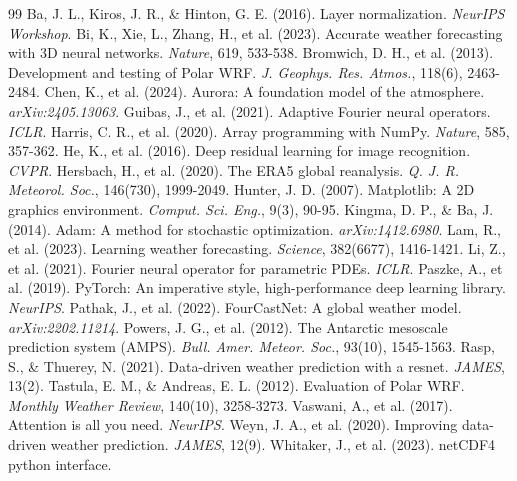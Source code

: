 \documentclass[12pt,titlepage,a4paper]{report}
\begin{document}
\begin{thebibliography}{99}
 Ba, J. L., Kiros, J. R., \& Hinton, G. E. (2016). Layer normalization. \textit{NeurIPS Workshop}.
 Bi, K., Xie, L., Zhang, H., et al. (2023). Accurate weather forecasting with 3D neural networks. \textit{Nature}, 619, 533-538.
 Bromwich, D. H., et al. (2013). Development and testing of Polar WRF. \textit{J. Geophys. Res. Atmos.}, 118(6), 2463-2484.
 Chen, K., et al. (2024). Aurora: A foundation model of the atmosphere. \textit{arXiv:2405.13063}.
 Guibas, J., et al. (2021). Adaptive Fourier neural operators. \textit{ICLR}.
 Harris, C. R., et al. (2020). Array programming with NumPy. \textit{Nature}, 585, 357-362.
 He, K., et al. (2016). Deep residual learning for image recognition. \textit{CVPR}.
 Hersbach, H., et al. (2020). The ERA5 global reanalysis. \textit{Q. J. R. Meteorol. Soc.}, 146(730), 1999-2049.
 Hunter, J. D. (2007). Matplotlib: A 2D graphics environment. \textit{Comput. Sci. Eng.}, 9(3), 90-95.
 Kingma, D. P., \& Ba, J. (2014). Adam: A method for stochastic optimization. \textit{arXiv:1412.6980}.
 Lam, R., et al. (2023). Learning weather forecasting. \textit{Science}, 382(6677), 1416-1421.
 Li, Z., et al. (2021). Fourier neural operator for parametric PDEs. \textit{ICLR}.
 Paszke, A., et al. (2019). PyTorch: An imperative style, high-performance deep learning library. \textit{NeurIPS}.
 Pathak, J., et al. (2022). FourCastNet: A global weather model. \textit{arXiv:2202.11214}.
 Powers, J. G., et al. (2012). The Antarctic mesoscale prediction system (AMPS). \textit{Bull. Amer. Meteor. Soc.}, 93(10), 1545-1563.
 Rasp, S., \& Thuerey, N. (2021). Data-driven weather prediction with a resnet. \textit{JAMES}, 13(2).
 Tastula, E. M., \& Andreas, E. L. (2012). Evaluation of Polar WRF. \textit{Monthly Weather Review}, 140(10), 3258-3273.
 Vaswani, A., et al. (2017). Attention is all you need. \textit{NeurIPS}.
 Weyn, J. A., et al. (2020). Improving data-driven weather prediction. \textit{JAMES}, 12(9).
 Whitaker, J., et al. (2023). netCDF4 python interface.
\end{thebibliography}
\end{document}
